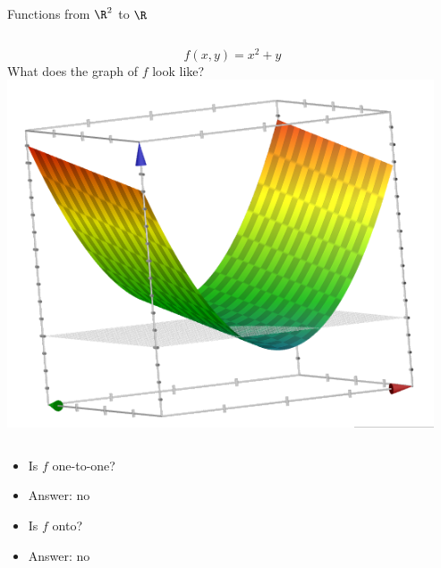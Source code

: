 \documentclass{beamer}
\begin{document}
\begin{frame}{Functions from $\R^2$ to $\R$}

\begin{columns}
\column[T]{5cm}
$$f(x,y) = x^2 + y$$
What does the graph of $f$ look like?
\column[T]{5cm}
\includegraphics[scale=0.3]{tilted-parabolic-sheet}
\end{columns}

\begin{itemize}
\item Is $f$ one-to-one?
\item Answer: no
\item Is $f$ onto?
\item Answer: no
\end{itemize}

\end{frame}
\end{document}
